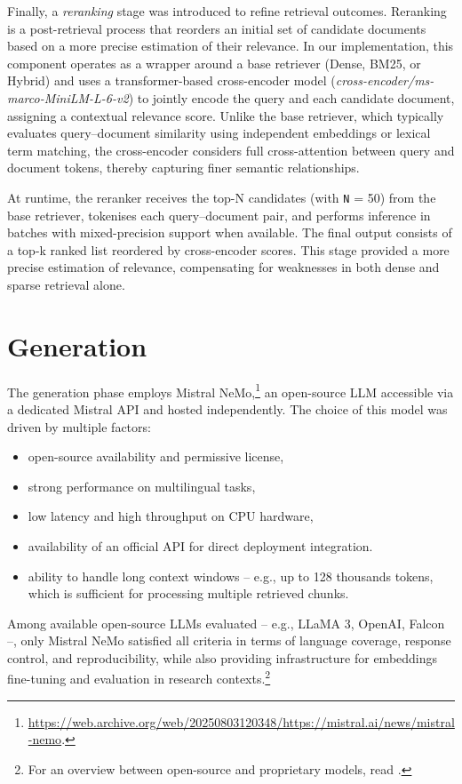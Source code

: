 \begin{spacing}{1.5}
Finally, a \textit{reranking} stage was introduced to refine retrieval outcomes. Reranking is a post-retrieval process that reorders an initial set of candidate documents based on a more precise estimation of their relevance. In our implementation, this component operates as a wrapper around a base retriever (Dense, BM25, or Hybrid) and uses a transformer-based cross-encoder model (\textit{cross-encoder/ms-marco-MiniLM-L-6-v2}) to jointly encode the query and each candidate document, assigning a contextual relevance score. Unlike the base retriever, which typically evaluates query–document similarity using independent embeddings or lexical term matching, the cross-encoder considers full cross-attention between query and document tokens, thereby capturing finer semantic relationships.

At runtime, the reranker receives the top-N candidates (with \texttt{N} = 50) from the base retriever, tokenises each query–document pair, and performs inference in batches with mixed-precision support when available. The final output consists of a top-k ranked list reordered by cross-encoder scores. This stage provided a more precise estimation of relevance, compensating for weaknesses in both dense and sparse retrieval alone.


\section{Generation}
The generation phase employs Mistral NeMo,\footnote{\url{https://web.archive.org/web/20250803120348/https://mistral.ai/news/mistral-nemo}.\nocite{noauthor_mistral_2025}} an open-source LLM accessible via a dedicated Mistral API and hosted independently. The choice of this model was driven by multiple factors:
\begin{itemize}
      \item open-source availability and permissive license,
      \item strong performance on multilingual tasks,
      \item low latency and high throughput on CPU hardware,
      \item availability of an official API for direct deployment integration.
      \item ability to handle long context windows -- e.g., up to 128 thousands tokens, which is sufficient for processing multiple retrieved chunks.
\end{itemize}

Among available open-source LLMs evaluated -- e.g., LLaMA 3, OpenAI, Falcon --, only Mistral NeMo satisfied all criteria in terms of language coverage, response control, and reproducibility, while also providing infrastructure for embeddings fine-tuning and evaluation in research contexts.\footnote{For an overview between open-source and proprietary models, read \textcite{noauthor_open_2025}.}


\end{spacing}

